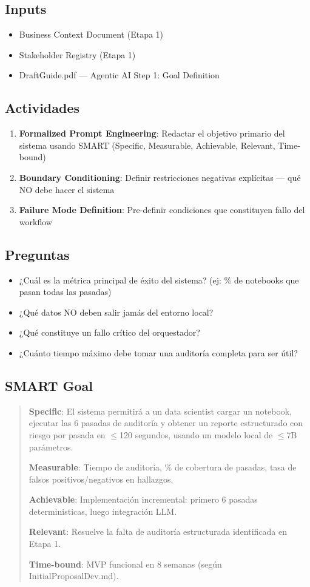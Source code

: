 \documentclass[12pt,a4paper]{article}
\begin{document}
\subsection*{Inputs}
\begin{itemize}
  \item Business Context Document (Etapa 1)
  \item Stakeholder Registry (Etapa 1)
  \item DraftGuide.pdf --- Agentic AI Step 1: Goal Definition
\end{itemize}

\subsection*{Actividades}
\begin{enumerate}
  \item \textbf{Formalized Prompt Engineering}: Redactar el objetivo primario del sistema usando SMART (Specific, Measurable, Achievable, Relevant, Time-bound)
  \item \textbf{Boundary Conditioning}: Definir restricciones negativas explícitas --- qué NO debe hacer el sistema
  \item \textbf{Failure Mode Definition}: Pre-definir condiciones que constituyen fallo del workflow
\end{enumerate}

\subsection*{Preguntas}
\begin{itemize}
  \item ¿Cuál es la métrica principal de éxito del sistema? (ej: \% de notebooks que pasan todas las pasadas)
  \item ¿Qué datos NO deben salir jamás del entorno local?
  \item ¿Qué constituye un fallo crítico del orquestador?
  \item ¿Cuánto tiempo máximo debe tomar una auditoría completa para ser útil?
\end{itemize}

\subsection*{SMART Goal}
\begin{quote}
\textbf{Specific}: El sistema permitirá a un data scientist cargar un notebook, ejecutar las 6 pasadas de auditoría y obtener un reporte estructurado con riesgo por pasada en $\leq$120 segundos, usando un modelo local de $\leq$7B parámetros.

\textbf{Measurable}: Tiempo de auditoría, \% de cobertura de pasadas, tasa de falsos positivos/negativos en hallazgos.

\textbf{Achievable}: Implementación incremental: primero 6 pasadas deterministicas, luego integración LLM.

\textbf{Relevant}: Resuelve la falta de auditoría estructurada identificada en Etapa 1.

\textbf{Time-bound}: MVP funcional en 8 semanas (según InitialProposalDev.md).
\end{quote}
\end{document}
